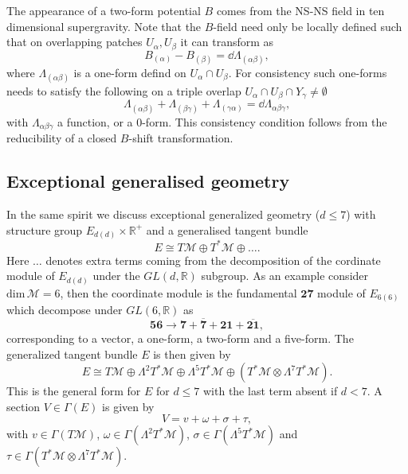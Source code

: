 The appearance of a two-form potential $B$ comes from the NS-NS field in ten dimensional supergravity. Note that the $B$-field need only be locally defined such that on overlapping patches $U_\alpha,U_\beta$ it can transform as 
\begin{equation}
   B_{(\alpha)}-B_{(\beta)} = \dd \Lambda_{(\alpha\beta)},
\end{equation}
where $\Lambda_{(\alpha\beta)}$ is a one-form defind on $U_\alpha\cap U_\beta$. For consistency such one-forms needs to satisfy the following on a triple overlap $U_\alpha\cap U_\beta\cap Y_\gamma\neq\emptyset$
\begin{equation}
    \Lambda_{(\alpha\beta)}+\Lambda_{(\beta\gamma)}+\Lambda_{(\gamma\alpha)} =\dd \Lambda_{\alpha\beta\gamma},
\end{equation}
with $\Lambda_{\alpha\beta\gamma}$ a function, or a $0$-form. This consistency condition follows from the reducibility of a closed $B$-shift transformation. 

\subsection{Exceptional generalised geometry}
In the same spirit we discuss exceptional generalized geometry ($d\leq 7$) with structure group $E_{d(d)}\times \mathbb{R}^+$ and a generalised tangent bundle 
\begin{equation}
    E\cong T\mathcal{M}\oplus T^*\mathcal{M}\oplus\ldots.
\end{equation}
Here $\ldots$ denotes extra terms coming from the decomposition of the cordinate module of $E_{d(d)}$ under the $GL(d,\mathbb{R})$ subgroup. As an example consider $\text{dim}\,\mathcal{M}=6$, then the coordinate module is the fundamental $\mathbf{27}$ module of $E_{6(6)}$ which decompose under $GL(6,\mathbb{R})$ as 
\begin{equation}
    \mathbf{56}\to \mathbf{7}+\overbar{\mathbf{7}}+\mathbf{21}+\overbar{\mathbf{21}},
\end{equation}
corresponding to a vector, a one-form, a two-form and a five-form. The generalized tangent bundle $E$ is then given by 
\begin{equation}
    E \cong T\mathcal{M}\oplus\Lambda^2T^*\mathcal{M}\oplus\Lambda^5T^*\mathcal{M}\oplus\left(T^*\mathcal{M}\otimes \Lambda^7T^*\mathcal{M}\right).
\end{equation}
This is the general form for $E$ for $d\leq7$ with the last term absent if $d<7$. A section $V\in\Gamma(E)$ is given by 
\begin{equation}
    V = v+\omega+\sigma+\tau,
\end{equation}
with $v\in\Gamma(T\mathcal{M})$, $\omega\in\Gamma(\Lambda^2T^*\mathcal{M})$, $\sigma\in\Gamma(\Lambda^5T^*\mathcal{M})$ and $\tau \in\Gamma(T^*\mathcal{M}\otimes \Lambda^7T^*\mathcal{M})$. 

